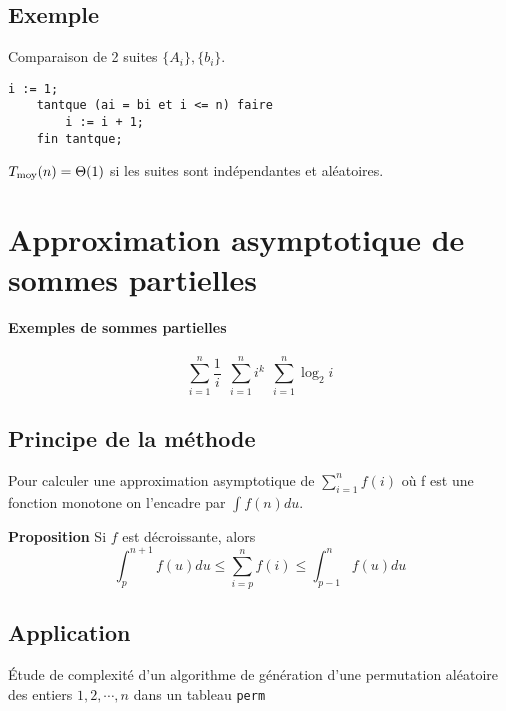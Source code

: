 \subsection{Exemple}
Comparaison de 2 suites $\{A_i\},\{b_i\}$.
\begin{lstlisting}[language=algo]
	i := 1;
	tantque (ai = bi et i <= n) faire
		i := i + 1;
	fin tantque;
\end{lstlisting}
$T_{\moy}(n) = \Theta(1)$ si les suites sont indépendantes et aléatoires.
\section{Approximation asymptotique de sommes partielles}
\paragraph{Exemples de sommes partielles}
$$\sum^n_{i=1}\frac{1}{i}\ \ \sum^n_{i=1} i^k\ \  \sum^n_{i=1} \log_2 i$$
\subsection{Principe de la méthode}
Pour calculer une approximation asymptotique de $\sum^n_{i=1} f(i)$ où f est une fonction monotone on l'encadre par $\int f(n)du$.

\textbf{Proposition } Si $f$ est décroissante, alors 
$$ \int^{n+1}_p f(u)du \leq \sum^n_{i=p} f(i) \leq \int^n_{p-1} f(u)du$$



\subsection{Application} Étude de complexité d'un algorithme de génération d'une permutation aléatoire des entiers $1,2,\cdots,n$ dans un tableau \texttt{perm}

